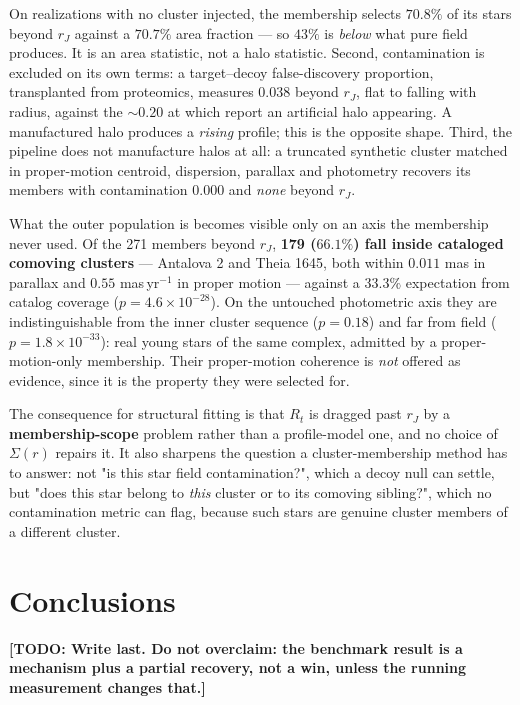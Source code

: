 \documentclass{aa}
\newcommand{\TODO}[1]{\textbf{[TODO: #1]}}
\begin{document}
On realizations with no cluster injected, the membership selects $70.8\%$ of its stars beyond
$r_J$ against a $70.7\%$ area fraction
--- so $43\%$ is \emph{below} what pure field produces. It is an area statistic, not a halo
statistic. Second, contamination is excluded on its own terms: a target--decoy false-discovery
proportion, transplanted from proteomics, measures $0.038$ beyond $r_J$, flat to falling with
radius, against the $\sim$$0.20$ at which \citet{pang2022} report an artificial halo appearing. A
manufactured halo produces a \emph{rising} profile; this is the opposite shape. Third, the
pipeline does not manufacture halos at all: a truncated synthetic cluster matched in proper-motion
centroid, dispersion, parallax and photometry recovers its members with contamination $0.000$ and
\emph{none} beyond $r_J$.

What the outer population is becomes visible only on an axis the membership never used. Of the
271 members beyond $r_J$, \textbf{179 ($66.1\%$) fall inside cataloged comoving clusters} ---
Antalova 2 and Theia 1645, both within $0.011$ mas in parallax and $0.55$ mas\,yr$^{-1}$ in proper
motion --- against a $33.3\%$ expectation from catalog coverage ($p = 4.6\times10^{-28}$). On the
untouched photometric axis they are indistinguishable from the inner cluster sequence
($p = 0.18$) and far from field ($p = 1.8\times10^{-33}$): real young stars of the same complex,
admitted by a proper-motion-only membership. Their proper-motion coherence is \emph{not} offered as
evidence, since it is the property they were selected for.

The consequence for structural fitting is that $R_t$ is dragged past $r_J$ by a
\textbf{membership-scope} problem rather than a profile-model one, and no choice of $\Sigma(r)$
repairs it. It also sharpens the question a cluster-membership method has to answer: not "is this
star field contamination?", which a decoy null can settle, but "does this star belong to \emph{this}
cluster or to its comoving sibling?", which no contamination metric can flag, because such stars
are genuine cluster members of a different cluster.

\section{Conclusions}
\label{sec:conclusions}

\TODO{Write last. Do not overclaim: the benchmark result is a mechanism plus a partial recovery,
not a win, unless the running measurement changes that.}
\end{document}
